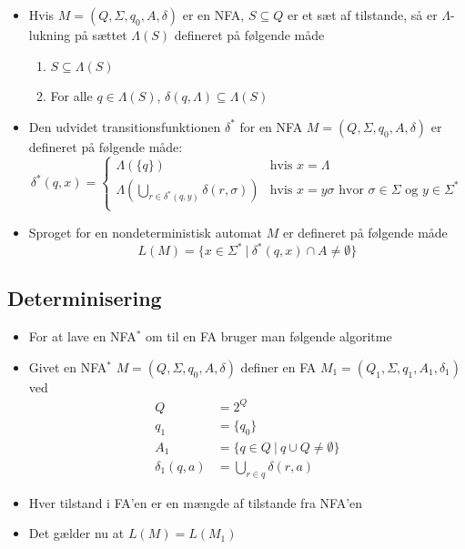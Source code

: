 \documentclass[a4, danish]{article}
\begin{document}
\begin{itemize}
  \item Hvis $M=(Q, \Sigma, q_0, A, \delta)$ er en NFA, $S\subseteq Q$ er et sæt af tilstande, så er $\Lambda$-lukning på sættet $\Lambda(S)$ defineret på følgende måde
  \begin{enumerate}
    \item $S \subseteq \Lambda(S)$
    \item For alle $q \in \Lambda(S)$, $\delta(q,\Lambda) \subseteq \Lambda(S)$
  \end{enumerate}
  \item Den udvidet transitionsfunktionen  $\delta^*$ for en NFA $M=(Q, \Sigma, q_0, A, \delta)$ er defineret på følgende måde:
  \begin{equation*}
  	\delta^*(q,x) =
  		\begin{cases}
  			\mbox{$\Lambda(\{q\})$} & \mbox{hvis $x = \Lambda$} \\
  			\mbox{$\Lambda(\bigcup_{r \in \delta^*(q,y)}\delta(r,\sigma))$} & \mbox{hvis $x = y\sigma$ hvor $\sigma \in \Sigma$ og $y \in \Sigma^*$} \\
  		\end{cases}
  \end{equation*}    
  
  \item Sproget for en nondeterministisk automat $M$ er defineret på følgende måde
  \begin{equation*}
    L(M)=\{ x \in \Sigma^*  \ | \ \delta^*(q,x) \cap A \ne \emptyset \}
  \end{equation*}
\end{itemize}


\subsection{Determinisering}
\begin{itemize}
  \item For at lave en NFA$^*$ om til en FA bruger man følgende algoritme
  \item Givet en NFA$^*$ $M=(Q,\Sigma,q_0,A,\delta)$ definer en FA $M_1=(Q_1,\Sigma, q_1,A_1,\delta_1)$ ved 
  \begin{align*}
    Q &= 2^Q \\
    q_1 &= \{q_0\} \\
    A_1 &= \{ q\in Q \ | \ q \cup Q \neq \emptyset \} \\
    \delta_1(q,a)&=\bigcup_{r\in q}\delta(r,a)
  \end{align*}
  \item Hver tilstand i FA'en er en mængde af tilstande fra NFA'en
  \item Det gælder nu at $L(M)=L(M_1)$
\end{itemize}
\end{document}
